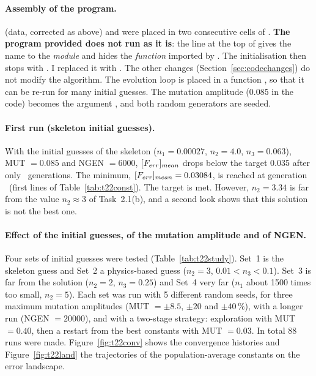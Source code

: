 \paragraph{Assembly of the program.}
 (data, corrected as above) and  were placed in two consecutive cells
of . \textbf{The program provided does not run as it is}: the line
 at the top of  gives the name  to the
\emph{module} and hides the \emph{function}  imported by . The
initialisation  then stops with
. I replaced it with .
The other changes (Section~\ref{sec:codechanges}) do not modify the algorithm. The evolution loop is
placed in a function , so that it can be re-run
for many initial guesses. The mutation amplitude (0.085 in the code) becomes the argument ,
and both random generators are seeded.

\paragraph{First run (skeleton initial guesses).}
With the initial guesses of the skeleton ($n_1=0.00027$, $n_2=4.0$, $n_3=0.063$), MUT $=0.085$ and
NGEN $=6000$, $[F_{err}]_{mean}$ drops below the target 0.035 after only \TwoTwoBaseKconv\ generations. The
minimum, $[F_{err}]_{mean}=0.03084$, is reached at generation \TwoTwoBaseKmin\ (first lines of
Table~\ref{tab:t22const}). The target is met. However, $n_2=3.34$ is far from the value
$n_2\approx3$ of Task~2.1(b), and a second look shows that this solution is not the best one.

\paragraph{Effect of the initial guesses, of the mutation amplitude and of NGEN.}
Four sets of initial guesses were tested (Table~\ref{tab:t22study}). Set~1 is the skeleton guess and
Set~2 a physics-based guess ($n_2=3$, $0.01<n_3<0.1$). Set~3 is far from the solution ($n_2=2$,
$n_3=0.25$) and Set~4 very far ($n_1$ about 1500 times too small, $n_2=5$). Each set was run with 5
different random seeds, for three maximum mutation amplitudes (MUT $=\pm8.5$, $\pm20$ and $\pm40\,\%$),
with a longer run (NGEN $=20000$), and with a two-stage strategy: exploration with MUT $=0.40$, then a
restart from the best constants with MUT $=0.03$. In total 88 runs were made.
Figure~\ref{fig:t22conv} shows the convergence histories and Figure~\ref{fig:t22land} the trajectories of
the population-average constants on the error landscape.


